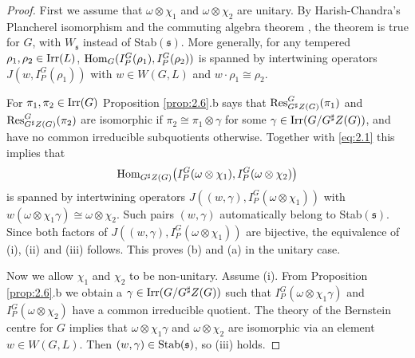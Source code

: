 \documentclass[11pt]{amsart}
\theoremstyle{definition}
\begin{document}
\begin{proof}
First we assume that $\omega \otimes \chi_1$ and $\omega \otimes \chi_2$ are unitary.
By Harish-Chandra's Plancherel isomorphism \cite{Wal} and the commuting algebra theorem 
\cite[Theorem 5.5.3.2]{Sil}, the theorem is true for $G$, with $W_{{\mathfrak s}}$ instead of Stab$({{\mathfrak s}})$.
More generally, for any tempered $\rho_1,\rho_2 \in {{\rm Irr}} (L)$, ${{\rm Hom}}_G (I_P^G (\rho_1),
I_P^G (\rho_2))$ is spanned by intertwining operators $J(w,I_P^G (\rho_1))$ with
$w \in W(G,L)$ and $w \cdot \rho_1 \cong \rho_2$.

For $\pi_1, \pi_2 \in {{\rm Irr}} (G)$ Proposition \ref{prop:2.6}.b says that 
${{\rm Res}}^G_{G^\sharp Z(G)}(\pi_1)$ and ${{\rm Res}}^G_{G^\sharp Z(G)}(\pi_2)$ are isomorphic if 
$\pi_2 \cong \pi_1 \otimes \gamma$ for some $\gamma \in {{\rm Irr}} (G / G^\sharp Z(G))$, and have 
no common irreducible subquotients otherwise. Together with \eqref{eq:2.1} this implies that 
\[
{{\rm Hom}}_{G^\sharp Z(G)}\big( I_P^G (\omega \otimes \chi_1), I_P^G (\omega \otimes \chi_2) \big)
\]
is spanned by intertwining operators $J( (w,\gamma), I_P^G (\omega \otimes \chi_1))$
with $w (\omega \otimes \chi_1 \gamma) \cong \omega \otimes \chi_2$. Such pairs $(w,\gamma)$
automatically belong to Stab$({{\mathfrak s}})$. Since both factors of $J( (w,\gamma), 
I_P^G (\omega \otimes \chi_1))$ are bijective, the equivalence of (i), (ii) and (iii) follows.
This proves (b) and (a) in the unitary case.

Now we allow $\chi_1$ and $\chi_2$ to be non-unitary. Assume (i). From Proposition 
\ref{prop:2.6}.b we obtain a $\gamma \in {{\rm Irr}} (G / G^\sharp Z(G))$ such that 
$I_P^G (\omega \otimes \chi_1 \gamma)$ and $I_P^G (\omega \otimes \chi_2)$ have a common 
irreducible quotient. The theory of the Bernstein centre for $G$ \cite{BeDe} implies that
$\omega \otimes \chi_1 \gamma$ and $\omega \otimes \chi_2$ are isomorphic via an element
$w \in W (G,L)$. Then $(w,\gamma) \in {{\rm Stab}} ({{\mathfrak s}})$, so (iii) holds.


\end{proof}
\end{document}
